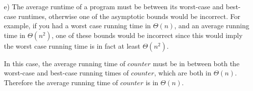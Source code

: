 \documentclass{article}
\begin{document}
\begin{enumerate}
	 
	 e) The average runtime of a program must be between its worst-case and best-case runtimes, otherwise one of the asymptotic bounds would be incorrect. For example, if you had a worst case running time in $\Theta(n)$, and an average running time in $\Theta(n^2)$, one of these bounds would be incorrect since this would imply the worst case running time is in fact at least $\Theta(n^2)$. 
	 
	 In this case, the average running time of $counter$ must be in between both the worst-case and best-case running times of $counter$, which are both in $\Theta(n)$. Therefore the average running time of $counter$ is in $\Theta(n)$.
			
\end{enumerate}
\end{document}

